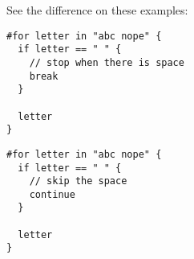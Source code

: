 See the difference on these examples:

\begin{verbatim}
#for letter in "abc nope" {
  if letter == " " {
    // stop when there is space
    break
  }

  letter
}
\end{verbatim}

\pandocbounded{}

\begin{verbatim}
#for letter in "abc nope" {
  if letter == " " {
    // skip the space
    continue
  }

  letter
}
\end{verbatim}

\pandocbounded{}
